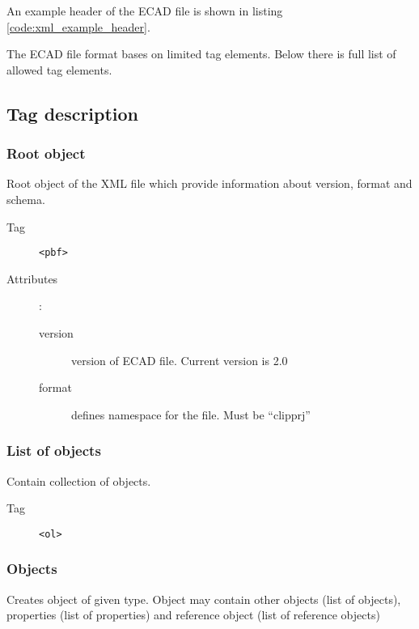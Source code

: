 \documentclass[%
	a4paper,
	oneside,
	listof=numbered,
	parskip=half,
	headsepline=true,
	footsepline=false,
	normalheadings,
	0.7headlines,
	headexclude,
	]{scrbook}
\begin{document}
An example header of the ECAD file is shown in listing \ref{code:xml_example_header}.



The ECAD file format bases on limited tag elements. Below there is full list of allowed tag elements.

\subsection{Tag description}

\subsubsection{Root object}

Root object of the XML file which provide information about version, format and schema.

\begin{description}
	\item[Tag] \verb|<pbf>|
	\item[Attributes]:
	
	\begin{description}
		\item[version] version of ECAD file. Current version is 2.0
		\item[format] defines namespace for the file. Must be “clipprj”
	\end{description}
\end{description}

\subsubsection{List of objects}

Contain collection of objects.

\begin{description}
	\item[Tag] \verb|<ol>|
\end{description}

\subsubsection{Objects}

Creates object of given type. Object may contain other objects (list of objects), properties (list of properties) and reference object (list of reference objects)
\end{document}
